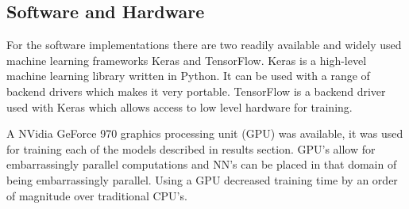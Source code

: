 \subsection{Software and Hardware}\label{hard-soft-ware}
For the software implementations there are two readily available and widely used machine learning frameworks Keras and TensorFlow. Keras is a high-level machine learning library written in Python. It can be used with a range of backend drivers which makes it very portable. TensorFlow is a backend driver used with Keras which allows access to low level hardware for training.

A NVidia GeForce 970 graphics processing unit (GPU) was available, it was used for training each of the models described in results section. GPU's allow for embarrassingly parallel computations and NN's can be placed in that domain of being embarrassingly parallel. Using a GPU decreased training time by an order of magnitude over traditional CPU's.
